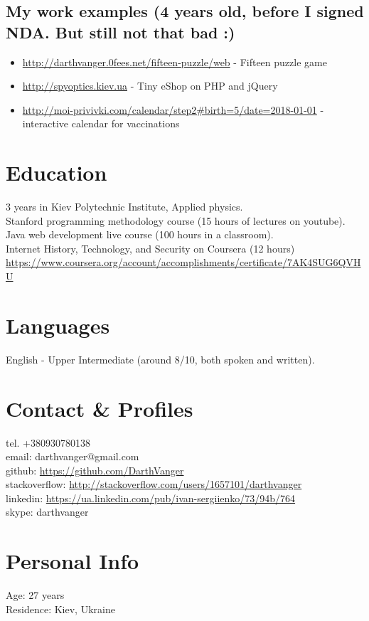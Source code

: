 \documentclass[a4paper, 14pt]{article}
\begin{document}
  \subsection{My work examples (4 years old, before I signed NDA. But still not that bad :)}
  \begin{itemize}
    \item \url{http://darthvanger.0fees.net/fifteen-puzzle/web} - Fifteen puzzle game
    \\
    \item \url{http://spyoptics.kiev.ua} - Tiny eShop on PHP and jQuery
    \\
    \item \url{http://moi-privivki.com/calendar/step2#birth=5/date=2018-01-01} - interactive calendar for vaccinations
  \end{itemize}

\section{Education}
	3 years in Kiev Polytechnic Institute, Applied physics. \\
	Stanford programming methodology course (15 hours of lectures on youtube). \\
	Java web development live course (100 hours in a classroom). \\
  Internet History, Technology, and Security on Coursera (12 hours) \url{https://www.coursera.org/account/accomplishments/certificate/7AK4SUG6QVHU}

\section{Languages}
	English - Upper Intermediate (around 8/10, both spoken and written).
\section{Contact \& Profiles}
	tel. +380930780138 \\
	email: darthvanger@gmail.com \\
  github: \url{https://github.com/DarthVanger} \\
  stackoverflow: \url{http://stackoverflow.com/users/1657101/darthvanger} \\
  linkedin: \url{https://ua.linkedin.com/pub/ivan-sergiienko/73/94b/764} \\
  skype: darthvanger
\section{Personal Info}
	Age: 27 years \\
	Residence: Kiev, Ukraine
\end{document}
